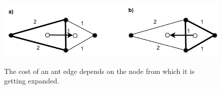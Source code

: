 \begin{figure}[h]
	\begin{centering}
		{\includegraphics[scale=0.9]{figures/approach/different_cost.pdf}}
		\caption{The cost of an ant edge depends on the node from which it is getting expanded.}
		\label{fig:different_cost}
	\end{centering}
\end{figure}
